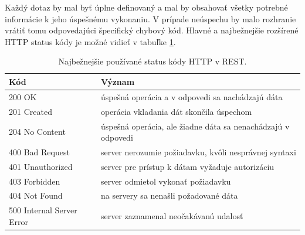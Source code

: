 Každý dotaz by mal byť úplne definovaný a mal by obsahovať všetky potrebné informácie k jeho úspešnému vykonaniu. V prípade neúspechu by malo rozhranie vrátiť tomu odpovedajúci špecifický chybový kód. Hlavné a najbežnejšie rozšírené HTTP status kódy je možné vidieť v tabuľke \ref{tab:rest-codes}.
\begin{table}[h]
\centering
\begin{tabular}{|l|l|}
\hline
Kód                       & Význam                                                                 \\ \hline
200 OK                    & úspešná operácia a v odpovedi sa nachádzajú dáta  \\ \hline
201 Created               & operácia vkladania dát skončila úspechom                               \\ \hline
204 No Content            & úspešná operácia, ale žiadne dáta sa nenachádzajú v odpovedi \\ \hline
400 Bad Request           & server nerozumie požiadavku, kvôli nesprávnej syntaxi                  \\ \hline
401 Unauthorized          & server pre prístup k dátam vyžaduje autorizáciu                        \\ \hline
403 Forbidden             & server odmietol vykonať požiadavku                                     \\ \hline
404 Not Found             & na servery sa nenašli požadované dáta                                  \\ \hline
500 Internal Server Error & server zaznamenal neočakávanú udalosť                                  \\ \hline
\end{tabular}
\caption{Najbežnejšie používané status kódy HTTP v REST.}
\label{tab:rest-codes}
\end{table}